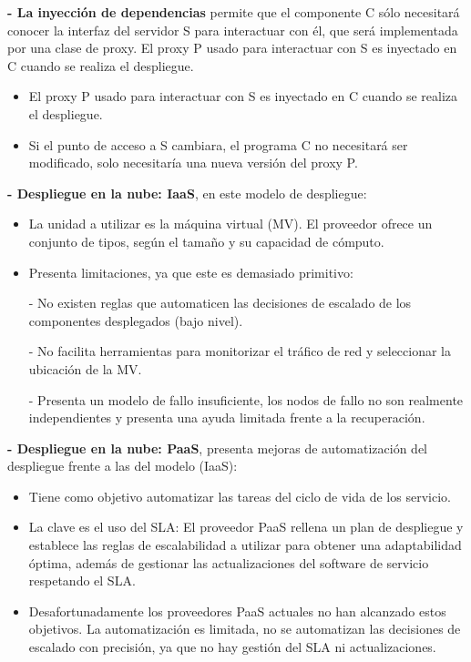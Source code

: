 \documentclass[12pt]{amsart}
\begin{document}
    {\bf - La inyección de dependencias} permite que el componente C sólo necesitará conocer la interfaz del servidor S para interactuar con él, que será implementada por una clase de proxy. El proxy P usado para interactuar con S es inyectado en C cuando se realiza el despliegue.
    \begin{itemize}
    
    \item  El proxy P usado para interactuar con S es inyectado en C cuando se realiza el despliegue.
    
    \item  Si el punto de acceso a S cambiara, el programa C no necesitará ser modificado, solo necesitaría una nueva versión del proxy P.
    
    \end{itemize}
    
    {\bf - Despliegue en la nube: IaaS}, en este modelo de despliegue:
    
    \begin{itemize}
    
    \item  La unidad a utilizar es la máquina virtual (MV). El proveedor ofrece un conjunto de tipos, según el tamaño y su capacidad de cómputo.
    
    \item  Presenta limitaciones, ya que este es demasiado primitivo:
    
    \subitem - No existen reglas que automaticen las decisiones de escalado de los componentes desplegados (bajo nivel).
    
    \subitem - No facilita herramientas para monitorizar el tráfico de red y seleccionar la ubicación de la MV.
    
    \subitem - Presenta un modelo de fallo insuficiente, los nodos de fallo no son realmente independientes y presenta una ayuda limitada frente a la recuperación.
    
    \end{itemize}
    
    {\bf - Despliegue en la nube: PaaS}, presenta mejoras de automatización del despliegue frente a las del modelo (IaaS):
    
    \begin{itemize}
    
    \item  Tiene como objetivo automatizar las tareas del ciclo de vida de los servicio.
    
    \item  La clave es el uso del SLA: El proveedor PaaS rellena un plan de despliegue y establece las reglas de escalabilidad a utilizar para obtener una adaptabilidad óptima, además de gestionar las actualizaciones del software de servicio respetando el SLA. 
    
    \item  Desafortunadamente los proveedores PaaS actuales no han alcanzado estos objetivos.
    La automatización es limitada, no se automatizan las decisiones de escalado con precisión, ya que no hay gestión del SLA ni actualizaciones.
    
    \end{itemize}
    
\end{document}
